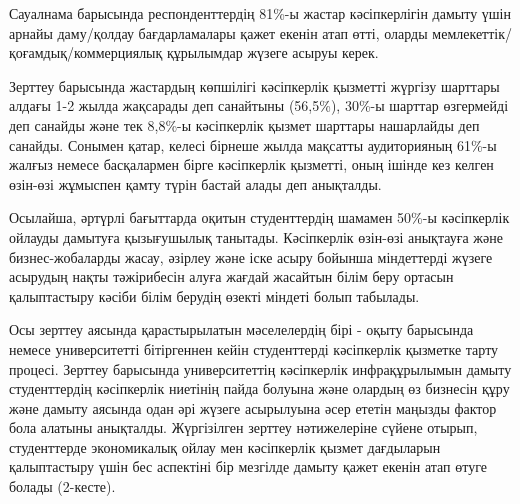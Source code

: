 \begin{multicols}{2}
Сауалнама барысында респонденттердің 81\%-ы жастар кәсіпкерлігін дамыту
үшін арнайы даму/қолдау бағдарламалары қажет екенін атап өтті, оларды
мемлекеттік/қоғамдық/коммерциялық құрылымдар жүзеге асыруы керек.

Зерттеу барысында жастардың көпшілігі кәсіпкерлік қызметті жүргізу
шарттары алдағы 1-2 жылда жақсарады деп санайтыны (56,5\%), 30\%-ы
шарттар өзгермейді деп санайды және тек 8,8\%-ы кәсіпкерлік қызмет
шарттары нашарлайды деп санайды. Сонымен қатар, келесі бірнеше жылда
мақсатты аудиторияның 61\%-ы жалғыз немесе басқалармен бірге кәсіпкерлік
қызметті, оның ішінде кез келген өзін-өзі жұмыспен қамту түрін бастай
алады деп анықталды.

Осылайша, әртүрлі бағыттарда оқитын студенттердің шамамен 50\%-ы
кәсіпкерлік ойлауды дамытуға қызығушылық танытады. Кәсіпкерлік өзін-өзі
анықтауға және бизнес-жобаларды жасау, әзірлеу және іске асыру бойынша
міндеттерді жүзеге асырудың нақты тәжірибесін алуға жағдай жасайтын
білім беру ортасын қалыптастыру кәсіби білім берудің өзекті міндеті
болып табылады.

Осы зерттеу аясында қарастырылатын мәселелердің бірі - оқыту барысында
немесе университетті бітіргеннен кейін студенттерді кәсіпкерлік қызметке
тарту процесі. Зерттеу барысында университеттің кәсіпкерлік
инфрақұрылымын дамыту студенттердің кәсіпкерлік ниетінің пайда болуына
және олардың өз бизнесін құру және дамыту аясында одан әрі жүзеге
асырылуына әсер ететін маңызды фактор бола алатыны анықталды.
Жүргізілген зерттеу нәтижелеріне сүйене отырып, студенттерде
экономикалық ойлау мен кәсіпкерлік қызмет дағдыларын қалыптастыру үшін
бес аспектіні бір мезгілде дамыту қажет екенін атап өтуге болады
(2-кесте).
\end{multicols}

